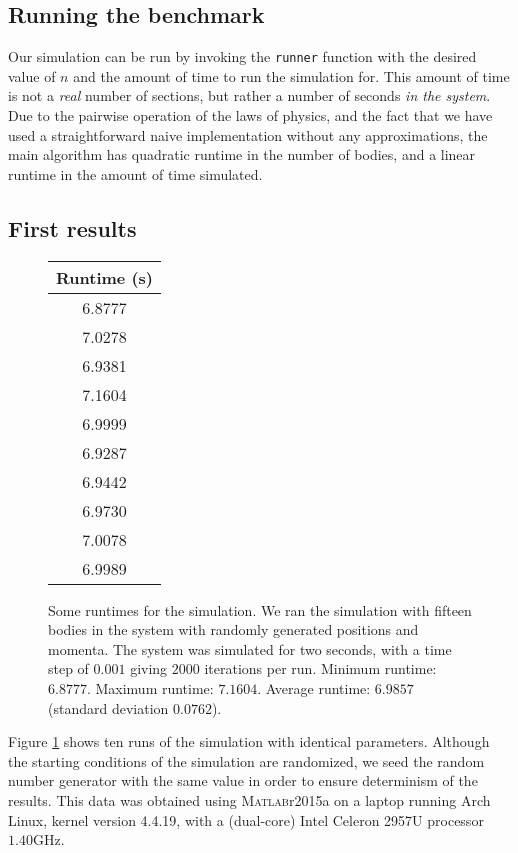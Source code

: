 \documentclass[11pt,letterpaper]{article}
\newcommand{\matlab}{\textsc{Matlab}}
\begin{document}
\subsection{Running the benchmark}

Our simulation can be run by invoking the \texttt{runner} function with the
desired value of $n$ and the amount of time to run the simulation for. This
amount of time is not a \emph{real} number of sections, but rather a number of
seconds \emph{in the system}. Due to the pairwise operation of the laws of
physics, and the fact that we have used a straightforward naive implementation
without any approximations, the main algorithm has quadratic runtime in the
number of bodies, and a linear runtime in the amount of time simulated.

\subsection{First results}

\begin{figure}[ht]
    \centering
    \begin{tabular}{|c|}
        \textbf{Runtime (s)} \\ \hline \hline
        6.8777 \\
        7.0278 \\
        6.9381 \\
        7.1604 \\
        6.9999 \\
        6.9287 \\
        6.9442 \\
        6.9730 \\
        7.0078 \\
        6.9989
    \end{tabular}

    \caption{
        Some runtimes for the simulation. We ran the simulation with fifteen
        bodies in the system with randomly generated positions and momenta. The
        system was simulated for two seconds, with a time step of $0.001$
        giving $2000$ iterations per run.
        Minimum runtime: $6.8777$.
        Maximum runtime: $7.1604$.
        Average runtime: $6.9857$ (standard deviation $0.0762$).
    }
    \label{data:unoptimized-run}
\end{figure}

Figure \ref{data:unoptimized-run} shows ten runs of the simulation with
identical parameters. Although the starting conditions of the simulation are
randomized, we seed the random number generator with the same value in order to
ensure determinism of the results. This data was obtained using \matlab r2015a
on a laptop running Arch Linux, kernel version 4.4.19, with a (dual-core) Intel
Celeron 2957U processor $1.40 \text{GHz}$.
\end{document}
